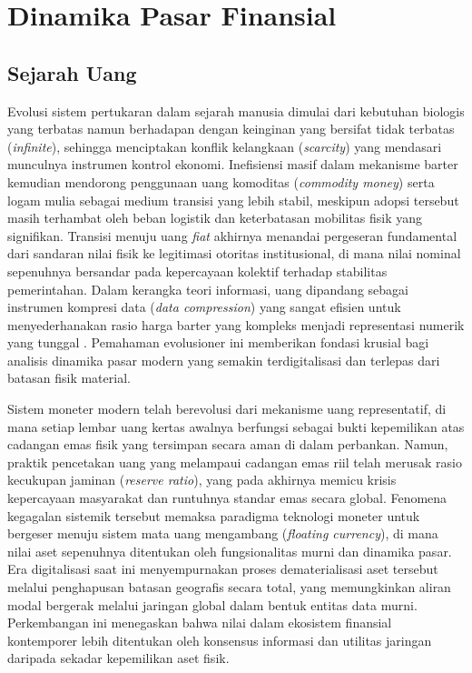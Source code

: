 \section{Dinamika Pasar Finansial}

\subsection{Sejarah Uang}
Evolusi sistem pertukaran dalam sejarah manusia dimulai dari kebutuhan biologis yang terbatas namun berhadapan dengan keinginan yang bersifat tidak terbatas (\textit{infinite}), sehingga menciptakan konflik kelangkaan (\textit{scarcity}) yang mendasari munculnya instrumen kontrol ekonomi. Inefisiensi masif dalam mekanisme barter kemudian mendorong penggunaan uang komoditas (\textit{commodity money}) serta logam mulia sebagai medium transisi yang lebih stabil, meskipun adopsi tersebut masih terhambat oleh beban logistik dan keterbatasan mobilitas fisik yang signifikan. Transisi menuju uang \textit{fiat} akhirnya menandai pergeseran fundamental dari sandaran nilai fisik ke legitimasi otoritas institusional, di mana nilai nominal sepenuhnya bersandar pada kepercayaan kolektif terhadap stabilitas pemerintahan. Dalam kerangka teori informasi, uang dipandang sebagai instrumen kompresi data (\textit{data compression}) yang sangat efisien untuk menyederhanakan rasio harga barter yang kompleks menjadi representasi numerik yang tunggal \cite{kolmogorov_three_1968}. Pemahaman evolusioner ini memberikan fondasi krusial bagi analisis dinamika pasar modern yang semakin terdigitalisasi dan terlepas dari batasan fisik material.

Sistem moneter modern telah berevolusi dari mekanisme uang representatif, di mana setiap lembar uang kertas awalnya berfungsi sebagai bukti kepemilikan atas cadangan emas fisik yang tersimpan secara aman di dalam perbankan. Namun, praktik pencetakan uang yang melampaui cadangan emas riil telah merusak rasio kecukupan jaminan (\textit{reserve ratio}), yang pada akhirnya memicu krisis kepercayaan masyarakat dan runtuhnya standar emas secara global. Fenomena kegagalan sistemik tersebut memaksa paradigma teknologi moneter untuk bergeser menuju sistem mata uang mengambang (\textit{floating currency}), di mana nilai aset sepenuhnya ditentukan oleh fungsionalitas murni dan dinamika pasar. Era digitalisasi saat ini menyempurnakan proses dematerialisasi aset tersebut melalui penghapusan batasan geografis secara total, yang memungkinkan aliran modal bergerak melalui jaringan global dalam bentuk entitas data murni. Perkembangan ini menegaskan bahwa nilai dalam ekosistem finansial kontemporer lebih ditentukan oleh konsensus informasi dan utilitas jaringan daripada sekadar kepemilikan aset fisik.

